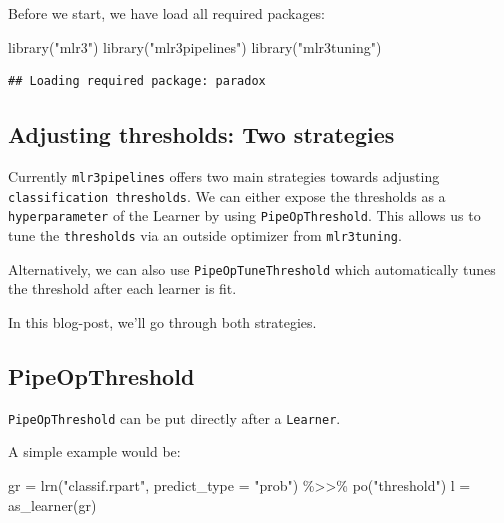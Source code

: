 \documentclass[
]{scrbook}
\newenvironment{Shaded}{\begin{snugshade}}{\end{snugshade}}
\newcommand{\AttributeTok}[1]{\textcolor[rgb]{0.77,0.63,0.00}{#1}}
\newcommand{\FunctionTok}[1]{\textcolor[rgb]{0.00,0.00,0.00}{#1}}
\newcommand{\NormalTok}[1]{#1}
\newcommand{\OtherTok}[1]{\textcolor[rgb]{0.56,0.35,0.01}{#1}}
\newcommand{\SpecialCharTok}[1]{\textcolor[rgb]{0.00,0.00,0.00}{#1}}
\newcommand{\StringTok}[1]{\textcolor[rgb]{0.31,0.60,0.02}{#1}}
\renewenvironment{Shaded} {\begin{snugshade}\small} {\end{snugshade}}
\begin{document}
Before we start, we have load all required packages:

\begin{Shaded}
\begin{Highlighting}[]
\FunctionTok{library}\NormalTok{(}\StringTok{"mlr3"}\NormalTok{)}
\FunctionTok{library}\NormalTok{(}\StringTok{"mlr3pipelines"}\NormalTok{)}
\FunctionTok{library}\NormalTok{(}\StringTok{"mlr3tuning"}\NormalTok{)}
\end{Highlighting}
\end{Shaded}

\begin{verbatim}
## Loading required package: paradox
\end{verbatim}

\hypertarget{adjusting-thresholds-two-strategies}{%
\subsection{Adjusting thresholds: Two strategies}\label{adjusting-thresholds-two-strategies}}

Currently \texttt{mlr3pipelines} offers two main strategies towards adjusting \texttt{classification\ thresholds}.
We can either expose the thresholds as a \texttt{hyperparameter} of the Learner by using \texttt{PipeOpThreshold}.
This allows us to tune the \texttt{thresholds} via an outside optimizer from \texttt{mlr3tuning}.

Alternatively, we can also use \texttt{PipeOpTuneThreshold} which automatically tunes the threshold after each learner is fit.

In this blog-post, we'll go through both strategies.

\hypertarget{pipeopthreshold}{%
\subsection{PipeOpThreshold}\label{pipeopthreshold}}

\texttt{PipeOpThreshold} can be put directly after a \texttt{Learner}.

A simple example would be:

\begin{Shaded}
\begin{Highlighting}[]
\NormalTok{gr }\OtherTok{=} \FunctionTok{lrn}\NormalTok{(}\StringTok{"classif.rpart"}\NormalTok{, }\AttributeTok{predict\_type =} \StringTok{"prob"}\NormalTok{) }\SpecialCharTok{\%\textgreater{}\textgreater{}\%} \FunctionTok{po}\NormalTok{(}\StringTok{"threshold"}\NormalTok{)}
\NormalTok{l }\OtherTok{=} \FunctionTok{as\_learner}\NormalTok{(gr)}
\end{Highlighting}
\end{Shaded}
\end{document}
